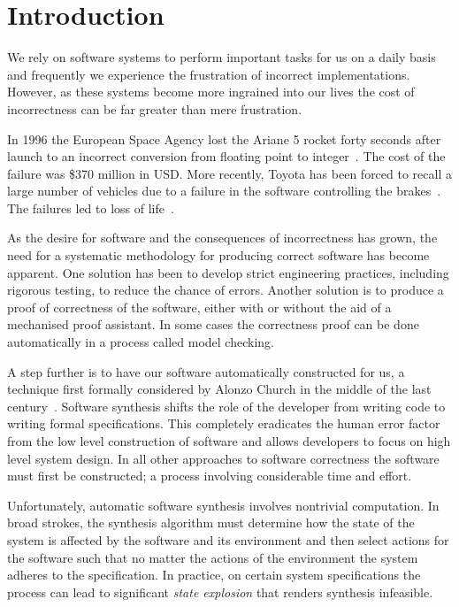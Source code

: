 \chapter{Introduction}

We rely on software systems to perform important tasks for us on a daily basis and frequently we experience the frustration of incorrect implementations. However, as these systems become more ingrained into our lives the cost of incorrectness can be far greater than mere frustration.

In 1996 the European Space Agency lost the Ariane 5 rocket forty seconds after launch to an incorrect conversion from floating point to integer~\cite{Dowson97}. The cost of the failure was \$370 million in USD. More recently, Toyota has been forced to recall a large number of vehicles due to a failure in the software controlling the brakes~\cite{Parrish13}. The failures led to loss of life~\cite{CBS10}.

As the desire for software and the consequences of incorrectness has grown, the need for a systematic methodology for producing correct software has become apparent. One solution has been to develop strict engineering practices, including rigorous testing, to reduce the chance of errors. Another solution is to produce a proof of correctness of the software, either with or without the aid of a mechanised proof assistant. In some cases the correctness proof can be done automatically in a process called model checking.

A step further is to have our software automatically constructed for us, a technique first formally considered by Alonzo Church in the middle of the last century~\cite{Church62}. Software synthesis shifts the role of the developer from writing code to writing formal specifications. This completely eradicates the human error factor from the low level construction of software and allows developers to focus on high level system design. In all other approaches to software correctness the software must first be constructed; a process involving considerable time and effort.

Unfortunately, automatic software synthesis involves nontrivial computation. In broad strokes, the synthesis algorithm must determine how the state of the system is affected by the software and its environment and then select actions for the software such that no matter the actions of the environment the system adheres to the specification. In practice, on certain system specifications the process can lead to significant \emph{state explosion} that renders synthesis infeasible.

